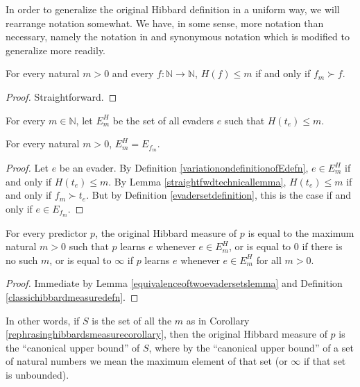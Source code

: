 \documentclass[twoside,11pt]{article}
\begin{document}
In order to generalize the original Hibbard definition in a uniform way, we will rearrange
notation somewhat. We have, in some sense, more notation than necessary, namely the notation
in \citep{hibbard} and synonymous notation which is modified to generalize more readily.

\begin{lemma}
\label{straightfwdtechnicallemma}
    For every natural $m>0$ and every $f:\mathbb N\to\mathbb N$,
    $H(f)\leq m$ if and only if $f_m\succ f$.
\end{lemma}

\begin{proof}
    Straightforward.
\end{proof}

\begin{definition}
\label{variationondefinitionofEdefn}
    For every $m\in\mathbb N$, let $E^H_m$
    be the set of all evaders $e$ such that $H(t_e)\leq m$.
\end{definition}

\begin{lemma}
\label{equivalenceoftwoevadersetslemma}
    For every natural $m>0$, $E^H_m=E_{f_m}$.
\end{lemma}

\begin{proof}
    Let $e$ be an evader. By Definition \ref{variationondefinitionofEdefn},
    $e\in E^H_m$ if and only if $H(t_e)\leq m$.
    By Lemma \ref{straightfwdtechnicallemma}, $H(t_e)\leq m$ if and only if
    $f_m\succ t_e$. But by Definition \ref{evadersetdefinition}, this is the
    case if and only if $e\in E_{f_m}$.
\end{proof}

\begin{corollary}
\label{rephrasinghibbardsmeasurecorollary}
    For every predictor $p$, the original Hibbard measure of $p$
    is equal to the maximum natural $m>0$ such that
    $p$ learns $e$ whenever $e\in E^H_m$,
    or is equal to $0$ if there is no such $m$,
    or is equal to $\infty$
    if $p$ learns $e$ whenever $e\in E^H_m$ for all $m>0$.
\end{corollary}

\begin{proof}
    Immediate by Lemma \ref{equivalenceoftwoevadersetslemma}
    and Definition \ref{classichibbardmeasuredefn}.
\end{proof}

In other words, if $S$ is the set of all the $m$ as in Corollary
\ref{rephrasinghibbardsmeasurecorollary}, then the original Hibbard
measure of $p$ is the ``canonical upper bound'' of $S$, where
by the ``canonical upper bound'' of a set of natural numbers
we mean the maximum element of that set (or $\infty$ if that set
is unbounded).
\end{document}
